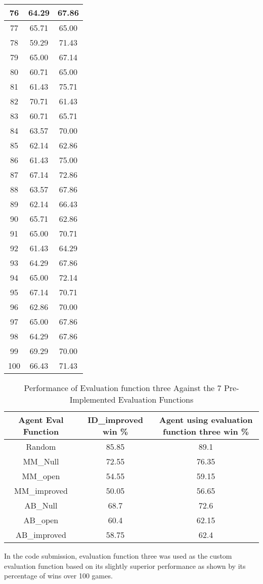 \documentclass[11pt]{article}
\begin{document}
\begin{longtable}[c]{| c | c |c |}
76 & 64.29 & 67.86 \\ \hline
77 & 65.71 & 65.00 \\ \hline
78 & 59.29 & 71.43 \\ \hline
79 & 65.00 & 67.14 \\ \hline
80 & 60.71 & 65.00 \\ \hline
81 & 61.43 & 75.71 \\ \hline
82 & 70.71 & 61.43 \\ \hline
83 & 60.71 & 65.71 \\ \hline
84 & 63.57 & 70.00 \\ \hline
85 & 62.14 & 62.86 \\ \hline
86 & 61.43 & 75.00 \\ \hline
87 & 67.14 & 72.86 \\ \hline
88 & 63.57 & 67.86 \\ \hline
89 & 62.14 & 66.43 \\ \hline
90 & 65.71 & 62.86 \\ \hline
91 & 65.00 & 70.71 \\ \hline
92 & 61.43 & 64.29 \\ \hline
93 & 64.29 & 67.86 \\ \hline
94 & 65.00 & 72.14 \\ \hline
95 & 67.14 & 70.71 \\ \hline
96 & 62.86 & 70.00 \\ \hline
97 & 65.00 & 67.86 \\ \hline
98 & 64.29 & 67.86 \\ \hline
99 & 69.29 & 70.00 \\ \hline
100 & 66.43 & 71.43 \\ \hline
\end{longtable}

\begin{table}[h!]
\caption{Performance of Evaluation function three Against the 7 Pre-Implemented Evaluation Functions}
\centering
\begin{tabular}{||c | c| c||} 
 \hline
Agent Eval Function & ID\_improved win \% & Agent using evaluation function three win \% \\ \hline
Random & 85.85 & 89.1 \\ \hline
MM\_Null & 72.55 & 76.35 \\ \hline
MM\_open & 54.55 & 59.15 \\ \hline
MM\_improved & 50.05 & 56.65 \\ \hline
AB\_Null & 68.7 & 72.6 \\ \hline
AB\_open & 60.4 & 62.15 \\ \hline
AB\_improved & 58.75 & 62.4 \\ \hline
\end{tabular}
\label{eval_fun3}
\end{table}

In the code submission, evaluation function three was used as the custom evaluation function based on its slightly superior performance as shown by its percentage of wins over 100 games.
\end{document}

